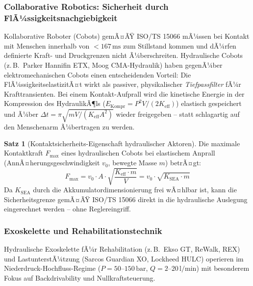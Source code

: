 ﻿\documentclass[a4paper,12pt]{scrreprt}
\theoremstyle{definition}
\newtheorem{satz}{Satz}[section]
\begin{document}
\subsubsection{Collaborative Robotics: Sicherheit durch FlÃ¼ssigkeitsnachgiebigkeit}

Kollaborative Roboter (Cobots) gemÃ¤ÃŸ ISO/TS 15066 mÃ¼ssen bei Kontakt
mit Menschen innerhalb von $< 167\,\mathrm{ms}$ zum Stillstand kommen
und dÃ¼rfen definierte Kraft- und Druckgrenzen nicht Ã¼berschreiten.
Hydraulische Cobots (z.\,B.\ Parker Hannifin ETX, Moog CMA-Hydraulik)
haben gegenÃ¼ber elektromechanischen Cobots einen entscheidenden Vorteil:
Die FlÃ¼ssigkeitselastizitÃ¤t wirkt als passiver, physikalischer
\emph{Tiefpassfilter} fÃ¼r Krafttransienten. Bei einem Kontakt-Aufprall
wird die kinetische Energie in der Kompression des HydraulikÃ¶ls
($E_{\mathrm{Kompr}} = P^2 V / (2 K_{\mathrm{eff}})$) elastisch gespeichert
und Ã¼ber $\Delta t = \pi \sqrt{m V / (K_{\mathrm{eff}} A^2)}$ wieder
freigegeben -- statt schlagartig auf den Menschenarm Ã¼bertragen zu werden.

\begin{satz}[Kontaktsicherheits-Eigenschaft hydraulischer Aktoren]
  Die maximale Kontaktkraft $F_{\max}$ eines hydraulischen Cobots bei
  elastischem Anprall (AnnÃ¤herungsgeschwindigkeit $v_0$, bewegte Masse $m$)
  betrÃ¤gt:
  \begin{equation}
    F_{\max} = v_0 \cdot A \cdot \sqrt{\frac{K_{\mathrm{eff}} \cdot m}{V}}
             = v_0 \cdot \sqrt{K_{\mathrm{SEA}} \cdot m}
    \label{eq:kontaktkraft_max}
  \end{equation}
  Da $K_{\mathrm{SEA}}$ durch die Akkumulatordimensionierung frei
  wÃ¤hlbar ist, kann die Sicherheitsgrenze gemÃ¤ÃŸ ISO/TS 15066 direkt
  in die hydraulische Auslegung eingerechnet werden -- ohne Regler\-eingriff.
\end{satz}

\subsubsection{Exoskelette und Rehabilitationstechnik}

Hydraulische Exoskelette fÃ¼r Rehabilitation (z.\,B.\ Ekso GT,
ReWalk, REX) und LastunterstÃ¼tzung (Sarcos Guardian XO,
Lockheed HULC) operieren im Niederdruck-Hochfluss-Regime
($P = 50$--$150\,\mathrm{bar}$, $Q = 2$--$20\,\mathrm{l/min}$)
mit besonderem Fokus auf Backdrivability und Nullkraftsteuerung.
\end{document}
